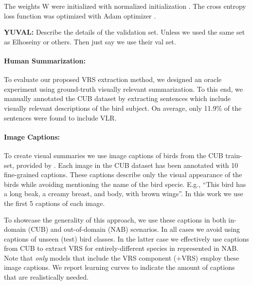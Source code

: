 \documentclass[11pt,a4paper]{article}
\newcommand\gal[1]{\textcolor{bright}{\textbf{GAL:} #1 }}
\newcommand\yuval[1]{\textcolor{darkpink}{\textbf{YUVAL:} #1 }}
\begin{document}


The weights W were initialized with normalized initialization \citep{glorot2010understanding}. The cross entropy loss function was optimized with Adam optimizer \citep{Adam}.



\yuval{Describe the details of the validation set. Unless we used the same set as Elhoseiny or others. Then just say we use their val set.}

\paragraph{Human Summarization:} 
To evaluate our proposed VRS extraction method, we designed an oracle experiment using ground-truth visually relevant summarization. To this end, we manually annotated the CUB dataset by extracting sentences which include visually relevant descriptions of the bird subject. On average, only 11.9\% of the sentences were found to include VLR.  

\paragraph{Image Captions:}
To create visual summaries we use image captions of birds from the CUB train-set, provided by \citet{reed2016learning}.  Each image in the CUB dataset has been annotated with 10 fine-grained captions. These captions describe only the visual appearance of the birds while avoiding mentioning the name of the bird specie. E.g., \enquote{This bird has a long beak, a creamy breast, and body, with brown wings}. In this work we use the first 5 captions of each image.


To showcase the generality of this approach, we use these captions in both in-domain (CUB) and out-of-domain (NAB) scenarios. In all cases we avoid using captions of unseen (test) bird classes.  In the latter case we effectively use captions from CUB to extract VRS for entirely-different species in represented in NAB.  Note that {\em only} models that include the VRS component (+VRS) employ these image captions. We report learning curves to indicate the amount of captions that are realistically needed.



\end{document}
